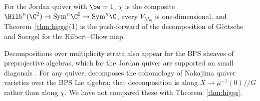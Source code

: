 \documentclass[11pt]{amsart}
\begin{document}
\begin{remark}
For the Jordan quiver with $\bw=1$, $\chi$ is the composite
$\Hilb^n(\C^2)\to\mathrm{Sym}^n\C^2\to\mathrm{Sym}^n\C$, every $V_{M_m}$ is
one-dimensional, and Theorem~\ref{thm:higgs}(1) is the push-forward of the
decomposition of G\"ottsche and Soergel for the Hilbert--Chow map.
\end{remark}

\begin{remark}
Decompositions over multiplicity strata also appear for the BPS sheaves of
preprojective algebras, which for the Jordan quiver are supported on small
diagonals \cite[Thm.~5.1, Cor.~5.3]{davisonIntegralityConjecture2023}.  For any quiver,
\cite[Thm.~1.14]{davisonBPSAlgebras2023} decomposes the cohomology of
Nakajima quiver varieties over the BPS Lie algebra; that decomposition is along
$X\to\mu^{-1}(0)/\!/G$ rather than along $\chi$.  We have not compared these
with Theorem~\ref{thm:higgs}.
\end{remark}
\end{document}
